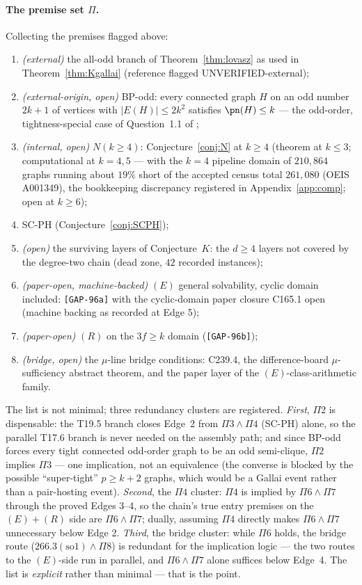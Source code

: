 \paragraph{The premise set $\Pi$.} Collecting the premises flagged above:
\begin{enumerate}[label=$\Pi\arabic*$,leftmargin=2.6em,itemsep=0.1em]
\item \emph{(external)} the all-odd branch of Theorem~\ref{thm:lovasz} as used in
Theorem~\ref{thm:Kgallai} (reference flagged UNVERIFIED-external);
\item \emph{(external-origin, open)} BP-odd: every connected graph $H$ on an odd number
$2k+1$ of vertices with $|E(H)|\le 2k^2$ satisfies $\pn(H)\le k$ --- the odd-order,
tightness-special case of Question~1.1 of \cite{BP19};
\item \emph{(internal, open)} $N(k\ge4)$: Conjecture~\ref{conj:N} at $k\ge4$ (theorem at
$k\le3$; computational at $k=4,5$ --- with the $k=4$ pipeline domain of $210{,}864$ graphs
running about $19\%$ short of the accepted census total $261{,}080$ (OEIS A001349), the
bookkeeping discrepancy registered in Appendix~\ref{app:comp}; open at $k\ge6$);
\item SC-PH (Conjecture~\ref{conj:SCPH});
\item \emph{(open)} the surviving layers of Conjecture~$K$: the $d\ge4$ layers not covered by
the degree-two chain (dead zone, $42$ recorded instances);
\item \emph{(paper-open, machine-backed)} $(E)$ general solvability, cyclic domain included:
\texttt{[GAP-96a]} with the cyclic-domain paper closure C165.1 open (machine backing as
recorded at Edge 5);
\item \emph{(paper-open)} $(R)$ on the $3f\ge k$ domain (\texttt{[GAP-96b]});
\item \emph{(bridge, open)} the $\mu$-line bridge conditions: C239.4, the difference-board
$\mu$-sufficiency abstract theorem, and the paper layer of the $(E)$-class-arithmetic family.
\end{enumerate}
The list is not minimal; three redundancy clusters are registered.
\emph{First}, $\Pi2$ is dispensable: the T19.5 branch closes Edge~2 from $\Pi3\wedge\Pi4$
(SC-PH) alone, so the parallel T17.6 branch is never needed on the assembly path; and since
BP-odd forces every tight connected odd-order graph to be an odd semi-clique, $\Pi2$ implies
$\Pi3$ --- one implication, not an equivalence (the converse is blocked by the possible
``super-tight'' $p\ge k+2$ graphs, which would be a Gallai event rather than a
pair-hosting event).
\emph{Second}, the $\Pi4$ cluster: $\Pi4$ is implied by $\Pi6\wedge\Pi7$ through the proved
Edges 3--4, so the chain's true entry premises on the $(E)+(R)$ side are $\Pi6\wedge\Pi7$;
dually, assuming $\Pi4$ directly makes $\Pi6\wedge\Pi7$ unnecessary below Edge 2.
\emph{Third}, the bridge cluster: while $\Pi6$ holds, the bridge route
($266.3(\mathrm{so1})\wedge\Pi8$) is redundant for the implication logic --- the two routes to
the $(E)$-side run in parallel, and $\Pi6\wedge\Pi7$ alone suffices below Edge~4.
The list is
\emph{explicit} rather than minimal --- that is the point.

